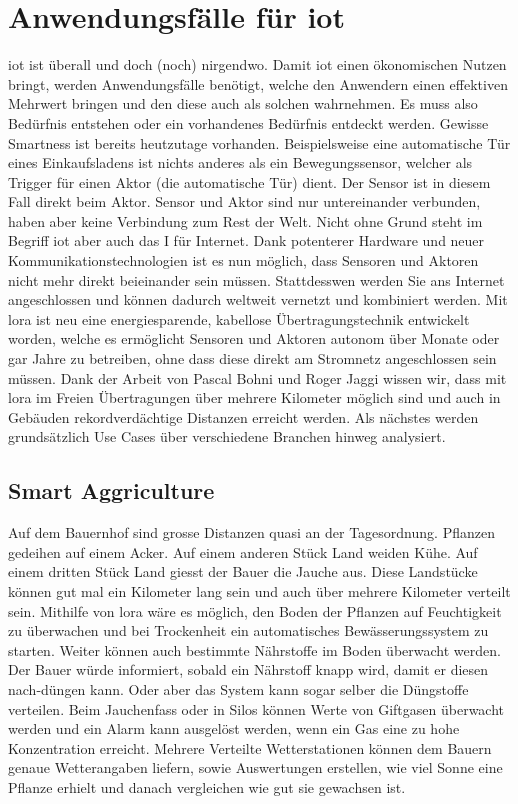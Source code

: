 \chapter{Anwendungsfälle für \gls{iot}}\label{Anwendungsfälle für IoT}

\gls{iot} ist überall und doch (noch) nirgendwo. Damit \gls{iot} einen ökonomischen Nutzen bringt, werden Anwendungsfälle benötigt, welche den Anwendern einen effektiven Mehrwert bringen und den diese auch als solchen wahrnehmen. Es muss also Bedürfnis entstehen oder ein vorhandenes Bedürfnis entdeckt werden. Gewisse \glqq{}Smartness\grqq{} ist bereits heutzutage vorhanden. Beispielsweise eine automatische Tür eines Einkaufsladens ist nichts anderes als ein Bewegungssensor, welcher als Trigger für einen Aktor (die automatische Tür) dient. Der Sensor ist in diesem Fall direkt beim Aktor. Sensor und Aktor sind nur untereinander verbunden, haben aber keine Verbindung zum \glqq{}Rest der Welt\grqq{}.
Nicht ohne Grund steht im Begriff \gls{iot} aber auch das \glqq{}I\grqq{} für Internet. Dank potenterer Hardware und neuer Kommunikationstechnologien ist es nun möglich, dass Sensoren und Aktoren nicht mehr direkt beieinander sein müssen. Stattdesswen werden Sie ans Internet angeschlossen und können dadurch weltweit vernetzt und kombiniert werden. Mit \gls{lora} ist neu eine energiesparende, kabellose Übertragungstechnik entwickelt worden, welche es ermöglicht Sensoren und Aktoren autonom über Monate oder gar Jahre zu betreiben, ohne dass diese direkt am Stromnetz angeschlossen sein müssen. Dank der Arbeit von Pascal Bohni und Roger Jaggi \autocite[29]{bfh:optimizedDataTransmission} wissen wir, dass mit \gls{lora} im Freien Übertragungen über mehrere Kilometer möglich sind und auch in Gebäuden rekordverdächtige Distanzen erreicht werden. Als nächstes werden grundsätzlich Use Cases über verschiedene Branchen hinweg analysiert.


\section{Smart Aggriculture}
Auf dem Bauernhof sind grosse Distanzen quasi an der Tagesordnung. Pflanzen gedeihen auf einem Acker. Auf einem anderen Stück Land weiden Kühe. Auf einem dritten Stück Land giesst der Bauer die Jauche aus. Diese Landstücke können gut mal ein Kilometer lang sein und auch über mehrere Kilometer verteilt sein. Mithilfe von \gls{lora} wäre es möglich, den Boden der Pflanzen auf Feuchtigkeit zu überwachen und bei Trockenheit ein automatisches Bewässerungssystem zu starten. Weiter können auch bestimmte Nährstoffe im Boden überwacht werden. Der Bauer würde informiert, sobald ein Nährstoff knapp wird, damit er diesen nach-düngen kann. Oder aber das System kann sogar selber die Düngstoffe verteilen. Beim Jauchenfass oder in Silos können Werte von Giftgasen überwacht werden und ein Alarm kann ausgelöst werden, wenn ein Gas eine zu hohe Konzentration erreicht. Mehrere Verteilte Wetterstationen können dem Bauern genaue Wetterangaben liefern, sowie Auswertungen erstellen, wie viel Sonne eine Pflanze erhielt und danach vergleichen wie gut sie gewachsen ist.


